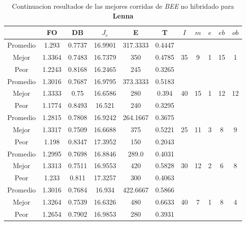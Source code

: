 \begin{table}[h!]
    \footnotesize
    \begin{center}
        \begin{tabular}{|c|c|c|c|c|c|c|c|c|c|c|}
        \hline
            & {\bf FO} & {\bf DB} & $J_e$ & {\bf E} & {\bf T} & $I$ & $m$ & $e$ & $eb$ & $ob$ \\
        \hline
        \hline
            Promedio  & 1.293 & 0.7737 & 16.9901 & 317.3333 & 0.4447 &  &  &  &  & \\
            \cline{1-6}
            Mejor & 1.3364 & 0.7483  & 16.7379 & 350 & 0.4785 & 35 & 9 & 1 & 15 & 1\\
            \cline{1-6}
            Peor & 1.2243 & 0.8168  & 16.2465 & 245 & 0.3265 &  &  &  &  & \\
        \hline
        \hline
            Promedio  & 1.3016 & 0.7687 & 16.9795 & 373.3333 & 0.5183 &  &  &  &  & \\
            \cline{1-6}
            Mejor & 1.3333 & 0.75  & 16.6586 & 280 & 0.394 & 40 & 15 & 1 & 12 & 12\\
            \cline{1-6}
            Peor & 1.1774 & 0.8493  & 16.521 & 240 & 0.3295 &  &  &  &  & \\
        \hline
        \hline
            Promedio  & 1.2815 & 0.7808 & 16.9242 & 264.1667 & 0.3675 &  &  &  &  & \\
            \cline{1-6}
            Mejor & 1.3317 & 0.7509  & 16.6688 & 375 & 0.5221 & 25 & 11 & 3 & 8 & 9\\
            \cline{1-6}
            Peor & 1.198 & 0.8347  & 17.3952 & 150 & 0.2043 &  &  &  &  & \\
        \hline
        \hline
            Promedio  & 1.2995 & 0.7698 & 16.8846 & 289.0 & 0.4031 &  &  &  &  & \\
            \cline{1-6}
            Mejor & 1.3313 & 0.7511  & 16.9553 & 420 & 0.5828 & 30 & 12 & 2 & 6 & 8\\
            \cline{1-6}
            Peor & 1.233 & 0.811  & 17.3257 & 300 & 0.4063 &  &  &  &  & \\
        \hline
        \hline
            Promedio  & 1.3016 & 0.7684 & 16.934 & 422.6667 & 0.5866 &  &  &  &  & \\
            \cline{1-6}
            Mejor & 1.3264 & 0.7539  & 16.6326 & 480 & 0.6633 & 40 & 7 & 1 & 8 & 4\\
            \cline{1-6}
            Peor & 1.2654 & 0.7902  & 16.9853 & 280 & 0.3931 &  &  &  &  & \\
        \hline
        \end{tabular}
        \caption{Continuacion resultados de las mejores corridas de \emph{BEE} no hibridado para {\bf Lenna}}
        \label{tb:tablebeealgimg}
    \end{center}
\end{table}
